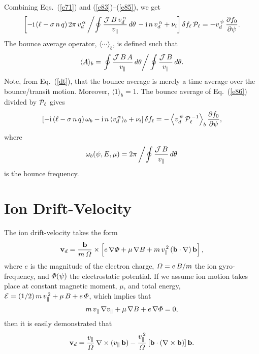 \documentclass[12pt,prb,aps,notitlepage]{revtex4-1}
\begin{document}
 Combining Eqs.~(\ref{e71}) and (\ref{e83})--(\ref{e85}), we get 
 \begin{equation}\label{e86}
 \left[-{\rm i}\,(\ell-\sigma\,n\,q)\,2\pi\,v_d^{\,\alpha}\left/\oint\frac{{\cal J}\,B\,v_d^{\,\alpha}}{v_\parallel}\,d\theta\right.-
 {\rm i}\,n\,v_d^{\,\alpha}+\nu_i\right]\delta f_{\ell}\,{\cal P}_{\ell} = - v_d^{\,\psi}\,\frac{\partial f_0}{\partial\psi}.
 \end{equation}
 The bounce average operator, $\langle \cdots\rangle_b$, is defined such that
 \begin{equation}\label{bounce}
 \langle A\rangle_b =\left.\oint\frac{{\cal J}\,B\,A}{v_\parallel}\,d\theta\right/ \oint\frac{{\cal J}\,B}{v_\parallel}\,d\theta.
 \end{equation}
 Note, from Eq.~(\ref{dt}), that the bounce average is merely a time average over the bounce/transit motion.  Moreover,  $\langle 1\rangle_b =1$. 
 The bounce average of Eq.~(\ref{e86}) divided by ${\cal P}_{\ell}$ gives
 \begin{equation}\label{e91}
 \left[-{\rm i}\,(\ell-\sigma\,n\,q)\,\omega_b -{\rm i}\,n\,\langle v_d^{\,\alpha}\rangle_b+\nu_i\right]\delta f_{\ell} = -
 \left\langle v_d^{\,\psi}\,{\cal P}_{\ell}^{\,-1}\right\rangle_b\frac{\partial f_0}{\partial\psi},
 \end{equation}
 where
 \begin{equation}\label{bounce}
 \omega_b(\psi,E,\mu) = 2\pi\left/\oint\frac{{\cal J}\,B}{v_\parallel}\,d\theta\right.
 \end{equation}
 is the bounce frequency. 
 
\section{Ion Drift-Velocity}
The ion drift-velocity takes the form
\begin{equation}
{\bf v}_d =\frac{{\bf b}}{m\,{\mit\Omega}}\times\left[e\,\nabla{\mit\Phi}+ \mu\,\nabla B + m\,v_\parallel^{\,2}\,({\bf b}\cdot\nabla)\,{\bf b}\right],
\end{equation}
where $e$ is the magnitude of the electron charge, ${\mit\Omega}=e\,B/m$  the ion gyro-frequency, and ${\mit\Phi}(\psi)$  the
electrostatic potential. If we assume ion motion takes place at constant magnetic moment, $\mu$, and total energy,
 ${\cal E}= (1/2)\,m\,v_\parallel^{\,2}+ \mu\,B+e\,{\mit\Phi}$, 
 which implies that
 \begin{equation}
 m\,v_\parallel\,\nabla v_\parallel + \mu\,\nabla B + e\,\nabla{\mit\Phi}=0,
 \end{equation}
 then it is easily
 demonstrated that
 \begin{equation}
 {\bf v}_d = \frac{v_\parallel}{{\mit\Omega}}\,\nabla\times (v_\parallel\,{\bf b}) - \frac{v_\parallel^{\,2}}{{\mit\Omega}}\,[{\bf b}\cdot(\nabla\times {\bf b})]\,{\bf b}.
 \end{equation}
 
\end{document}
